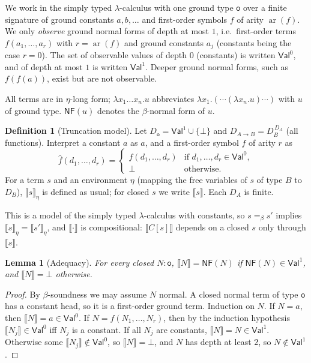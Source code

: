 \documentclass[11pt]{article}
\newcommand{\Ground}{\mathsf{o}\xspace}
\newcommand{\NF}{\mathsf{NF}\xspace}
\newcommand{\Val}{\mathsf{Val}\xspace}
\newcommand{\arity}{\operatorname{ar}}
\newcommand{\sem}[1]{\llbracket #1\rrbracket}
\newtheorem{lemma}[theorem]{Lemma}
\theoremstyle{definition}
\newtheorem{definition}[theorem]{Definition}
\begin{document}
We work in the simply typed $\lambda$-calculus with one ground type
$\Ground$ over a finite signature of ground constants $a,b,\ldots$ and
first-order symbols $f$ of arity $\arity(f)$.  We only \emph{observe}
ground normal forms of depth at most $1$, i.e.\ first-order terms
$f(a_1,\ldots,a_r)$ with $r=\arity(f)$ and ground constants $a_j$
(constants being the case $r=0$).  The set of observable values of depth
$0$ (constants) is written $\Val^0$, and of depth at most $1$ is written
$\Val^1$.  Deeper ground normal forms, such as $f(f(a))$, exist but are
not observable.

All terms are in $\eta$-long form; $\lambda x_1\ldots x_n.u$ abbreviates
$\lambda x_1.(\cdots(\lambda x_n.u)\cdots)$ with $u$ of ground type.
$\NF(u)$ denotes the $\beta$-normal form of $u$.

\begin{definition}[Truncation model]
Let $D_\Ground=\Val^1\cup\{\bot\}$ and $D_{A\to B}=D_B^{\,D_A}$ (all
functions).  Interpret a constant $a$ as $a$, and a first-order symbol $f$
of arity $r$ as
\[
  \hat f(d_1,\ldots,d_r)=
  \begin{cases}
    f(d_1,\ldots,d_r) & \text{if } d_1,\ldots,d_r\in\Val^0,\\
    \bot & \text{otherwise.}
  \end{cases}
\]
For a term $s$ and an environment $\eta$ (mapping the free variables of
$s$ of type $B$ to $D_B$), $\sem{s}_\eta$ is defined as usual; for closed
$s$ we write $\sem{s}$.  Each $D_A$ is finite.
\end{definition}

This is a model of the simply typed $\lambda$-calculus with constants, so
$s=_\beta s'$ implies $\sem{s}_\eta=\sem{s'}_\eta$, and $\sem{\cdot}$ is
compositional: $\sem{C[s]}$ depends on a closed $s$ only through $\sem{s}$.

\begin{lemma}[Adequacy]\label{lem:adequacy}
For every closed $N:\Ground$, $\sem N=\NF(N)$ if $\NF(N)\in\Val^1$, and
$\sem N=\bot$ otherwise.
\end{lemma}
\begin{proof}
By $\beta$-soundness we may assume $N$ normal.  A closed normal term of
type $\Ground$ has a constant head, so it is a first-order ground term.
Induction on $N$.  If $N=a$, then $\sem{N}=a\in\Val^0$.  If
$N=f(N_1,\ldots,N_r)$, then by the induction hypothesis
$\sem{N_j}\in\Val^0$ iff $N_j$ is a constant.  If all $N_j$ are
constants, $\sem{N}=N\in\Val^1$.  Otherwise some $\sem{N_j}\notin\Val^0$,
so $\sem{N}=\bot$, and $N$ has depth at least $2$, so $N\notin\Val^1$.
\end{proof}
\end{document}
